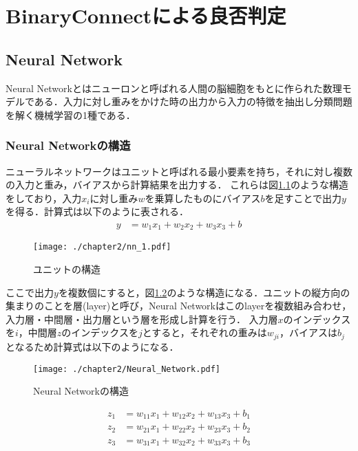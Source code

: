 

\chapter{BinaryConnectによる良否判定}

\section{Neural Network}
Neural Networkとはニューロンと呼ばれる人間の脳細胞をもとに作られた数理モデルである．入力に対し重みをかけた時の出力から入力の特徴を抽出し分類問題を解く機械学習の1種である．

\subsection{Neural Networkの構造}
ニューラルネットワークはユニットと呼ばれる最小要素を持ち，それに対し複数の入力と重み，バイアスから計算結果を出力する．
これらは図\ref{fig_NN1}のような構造をしており，入力$x_i$に対し重み$w$を乗算したものにバイアス$b$を足すことで出力$y$を得る．計算式は以下のように表される．
\begin{align*}
y &= w_{1}x_{1} + w_{2}x_{2} + w_{3}x_{3} + b
\end{align*}
\begin{figure}[]
  \begin{center}
    \texttt{[image: ./chapter2/nn\_1.pdf]}
    \caption{ユニットの構造}
    \label{fig_NN1}
  \end{center}
\end{figure}

ここで出力$y$を複数個にすると，図\ref{fig_NN}のような構造になる．ユニットの縦方向の集まりのことを層(layer)と呼び，Neural Networkはこのlayerを複数組み合わせ，入力層・中間層・出力層という層を形成し計算を行う．
入力層$x$のインデックスを$i$，中間層$z$のインデックスを$j$とすると，それぞれの重みは$w_{ji}$，バイアスは$b_j$となるため計算式は以下のようになる．
\begin{figure}[]
  \begin{center}
    \texttt{[image: ./chapter2/Neural\_Network.pdf]}
    \caption{Neural Networkの構造}
    \label{fig_NN}
  \end{center}
\end{figure}
\begin{align*}
z_{1} &= w_{11}x_{1} + w_{12}x_{2} + w_{13}x_{3} + b_1\\
z_{2} &= w_{21}x_{1} + w_{22}x_{2} + w_{23}x_{3} + b_2\\
z_{3} &= w_{31}x_{1} + w_{32}x_{2} + w_{33}x_{3} + b_3
\end{align*}


